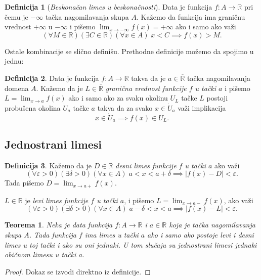 \documentclass[a4paper,12pt]{article}
\theoremstyle{plain}
\newtheorem{theorem}{Teorema}[section]
\theoremstyle{definition}
\newtheorem{definition}{Definicija}[section]
\theoremstyle{remark}
\begin{document}
\begin{definition}[\textit{Beskonačan limes u beskonačnosti}]
    Data je funkcija $f : A \to \mathbb{R}$ pri čemu je $-\infty$ tačka nagomilavanja skupa $A$. Kažemo da funkcija ima graničnu vrednost $+\infty$ u $-\infty$ i pišemo $\displaystyle \lim_{x \to -\infty} f(x) = +\infty$ ako i samo ako važi
    \[ (\forall M \in \mathbb{R})(\exists C \in \mathbb{R})(\forall x \in A) \; x < C \implies f(x) > M. \]
\end{definition}
Ostale kombinacije se slično definišu. Prethodne definicije možemo da spojimo u jednu:
\begin{definition}
    \label{def15-7}
    Data je funkcija $f : A \to \mathbb{R}$ takva da je $a \in \overline{\mathbb{R}}$ tačka nagomilavanja domena $A$. Kažemo da je $L \in \overline{\mathbb{R}}$ \textit{granična vrednost funkcije $f$ u tački $a$} i pišemo $\displaystyle L = \lim_{x \to a} f(x)$ ako i samo ako za svaku okolinu $U_L$ tačke $L$ postoji probušena okolina $\dot{U}_a$ tačke $a$ takva da za svako $x \in \dot{U}_a$ važi implikacija
    \[ x \in \dot{U}_a \implies f(x) \in U_L. \]
\end{definition}
\subsection{Jednostrani limesi}
\begin{definition}
    Kažemo da je $D \in \mathbb{R}$ \textit{desni limes funkcije $f$ u tački $a$} ako važi
    \[ (\forall \varepsilon > 0)(\exists \delta > 0)(\forall x \in A) \; a < x < a + \delta \implies |f(x) - D| < \varepsilon. \]
    Tada pišemo $\displaystyle D = \lim_{x \to a+} f(x)$.
    
    $L \in \mathbb{R}$ je \textit{levi limes funkcije $f$ u tački $a$}, i pišemo $\displaystyle L = \lim_{x \to a-} f(x)$, ako važi
    \[ (\forall \varepsilon > 0)(\exists \delta > 0)(\forall x \in A) \; a - \delta < x < a \implies |f(x) - L| < \varepsilon. \]
\end{definition}
\begin{theorem}
    Neka je data funkcija $f : A \to \mathbb{R}$ i $a \in \mathbb{R}$ koja je tačka nagomilavanja skupa $A$. Tada funkcija $f$ ima limes u tački $a$ ako i samo ako postoje levi i desni limes u toj tački i ako su oni jednaki. U tom slučaju su jednostrani limesi jednaki običnom limesu u tački $a$.
\end{theorem}
\begin{proof}
    Dokaz se izvodi direktno iz definicije.
\end{proof}
\end{document}
